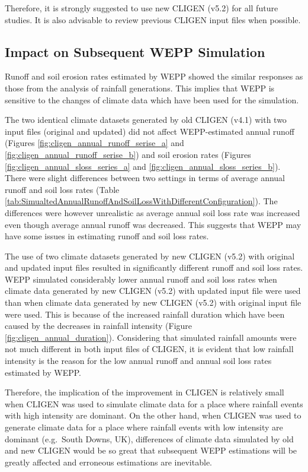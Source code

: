 Therefore, it is strongly suggested to use new CLIGEN (v5.2) for all future
studies. It is also advisable to review previous CLIGEN input files when
possible.

\subsection{Impact on Subsequent WEPP Simulation}

Runoff and soil erosion rates estimated by WEPP showed the similar responses as
those from the analysis of rainfall generations. This implies that WEPP is
sensitive to the changes of climate data which have been used for the
simulation.

The two identical climate datasets generated by old CLIGEN (v4.1) with two input
files (original and updated) did not affect WEPP-estimated annual runoff
(Figures \ref{fig:cligen_annual_runoff_serise_a} and
\ref{fig:cligen_annual_runoff_serise_b}) and soil erosion rates (Figures
\ref{fig:cligen_annual_sloss_series_a} and
\ref{fig:cligen_annual_sloss_series_b}).
There were slight differences between two settings in terms of average annual
runoff and soil loss rates (Table
\ref{tab:SimualtedAnnualRunoffAndSoilLossWithDifferentConfiguration}). The
differences were however unrealistic as average annual soil loss rate was
increased even though average annual runoff was decreased. This suggests that
WEPP may have some issues in estimating runoff and soil loss rates.

The use of two climate datasets generated by new CLIGEN (v5.2) with original and
updated input files resulted in significantly different runoff and soil loss
rates. WEPP simulated considerably lower annual runoff and soil loss rates when
climate data generated by new CLIGEN (v5.2) with updated input file were used
than when climate data generated by new CLIGEN (v5.2) with original input file
were used. This is because of the increased rainfall duration which have
been caused by the decreases in rainfall intensity (Figure
\ref{fig:cligen_annual_duration}). Considering that simulated rainfall amounts
were not much different in both input files of CLIGEN, it is evident that low
rainfall intensity is the reason for the low annual runoff and annual soil loss
rates estimated by WEPP.

Therefore, the implication of the improvement in CLIGEN is relatively small when
CLIGEN was used to simulate climate data for a place where rainfall events
with high intensity are dominant. On the other hand, when CLIGEN was used
to generate climate data for a place where rainfall events with low intensity
are dominant (e.g.\ South Downs, UK), differences of climate data simulated by
old and new CLIGEN would be so great that subsequent WEPP estimations will be
greatly affected and erroneous estimations are inevitable.

